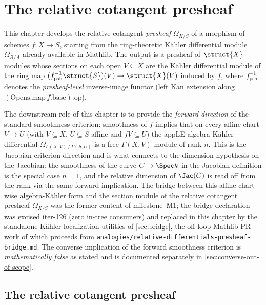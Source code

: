 \chapter{The relative cotangent presheaf}
\label{chap:differentials}

This chapter develops the relative cotangent \emph{presheaf} \(\Omega_{X/S}\) of a morphism of schemes \(f \colon X \to S\), starting from the ring-theoretic K\"ahler differential module \(\Omega_{B/A}\) already available in Mathlib. The output is a presheaf of \(\struct{X}\)-modules whose sections on each open \(V \subseteq X\) are the K\"ahler differential module of the ring map \((f^{-1}_{\mathrm{psh}}\struct{S})(V) \to \struct{X}(V)\) induced by \(f\), where \(f^{-1}_{\mathrm{psh}}\) denotes the \emph{presheaf-level} inverse-image functor (left Kan extension along \((\mathrm{Opens.map}\,f.\mathrm{base}).\mathrm{op}\)).

The downstream role of this chapter is to provide the \emph{forward direction} of the standard smoothness criterion: smoothness of \(f\) implies that on every affine chart \(V \to U\) (with \(V \subseteq X\), \(U \subseteq S\) affine and \(f V \subseteq U\)) the appLE-algebra K\"ahler differential \(\Omega_{\Gamma(X, V)\,/\,\Gamma(S, U)}\) is a free \(\Gamma(X, V)\)-module of rank \(n\). This is the Jacobian-criterion direction and is what connects to the dimension hypothesis on the Jacobian: the smoothness of the curve \(C \to \Spec k\) in the Jacobian definition is the special case \(n = 1\), and the relative dimension of \(\Jac(C)\) is read off from the rank via the same forward implication. The bridge between this affine-chart-wise algebra-K\"ahler form and the section module of the relative cotangent presheaf \(\Omega_{X/S}\) was the former content of milestone~M1; the bridge declaration was excised iter-126 (zero in-tree consumers) and replaced in this chapter by the standalone K\"ahler-localization utilities of \cref{sec:bridge}, the off-loop Mathlib-PR work of which proceeds from \texttt{analogies/relative-differentials-presheaf-bridge.md}. The converse implication of the forward smoothness criterion is \emph{mathematically false} as stated and is documented separately in \cref{sec:converse-out-of-scope}.

\section{The relative cotangent presheaf}

